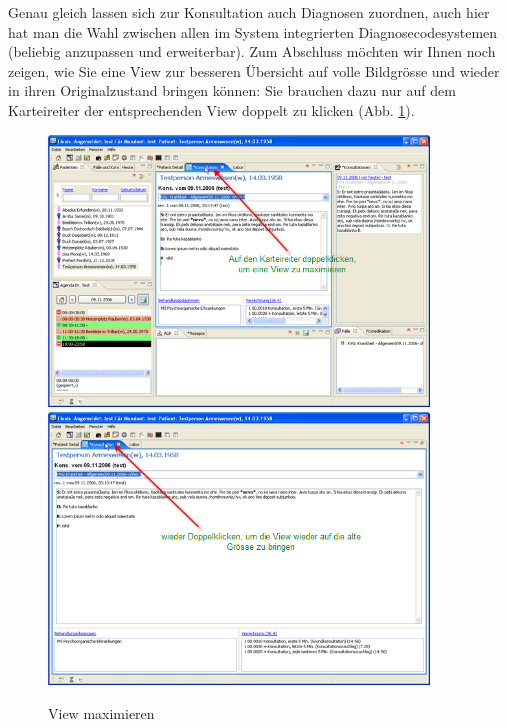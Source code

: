 Genau gleich lassen sich zur Konsultation auch Diagnosen zuordnen, auch hier hat man die Wahl zwischen allen im System integrierten
Diagnosecodesystemen (beliebig anzupassen und erweiterbar).
Zum Abschluss möchten wir Ihnen noch zeigen, wie Sie eine View zur besseren Übersicht auf volle Bildgrösse und wieder
in ihren Originalzustand bringen können: Sie brauchen dazu nur auf dem Karteireiter der entsprechenden View doppelt zu
klicken (Abb. \ref{fig:viewmax}).
\begin{figure}[ht]
	\includegraphics[width=0.9\textwidth]{images/einf8}
	\includegraphics[width=0.9\textwidth]{images/einf9}
	\caption{View maximieren}
	\label{fig:viewmax}
\end{figure}

